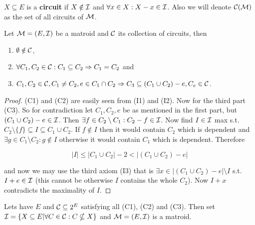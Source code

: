 \begin{defn}
	$X \subseteq E$ is a \textbf{circuit} if $X \notin \mathcal{I}$ and $\forall x \in X : X - x \in \mathcal{I}$. Also we will denote $\mathcal{C}(\mathcal{M})$ as the set of all circuits of $\mathcal{M}$.
\end{defn}

\begin{lemma}
	Let $\mathcal{M} = (E, \mathcal{I})$ be a matroid and $\mathcal{C}$ its collection of circuits, then
	
	\begin{enumerate}[(C1)]
		\item $\emptyset \notin \mathcal{C}$,
		\item $\forall C_1, C_2 \in \mathcal{C} : C_1 \subseteq C_2 \Rightarrow C_1 = C_2$ and
		\item $C_1, C_2 \in \mathcal{C}, C_1 \neq C_2, e \in C_1 \cap C_2 \Rightarrow C_3 \subseteq (C_1 \cup C_2) -e , C_e \in \mathcal{C}$.
	\end{enumerate}
\end{lemma}

\begin{proof}
	(C1) and (C2) are easily seen from (I1) and (I2). Now for the third part (C3). So for contradiction let $C_1, C_2, e$ be as mentioned in the first part, but $(C_1 \cup C_2) - e \in \mathcal{I}$. Then $\exists f \in C_2 \setminus C_1 : C_2 - f \in \mathcal{I}$. Now find $I \in \mathcal{I}$ max s.t. $C_2 \setminus \{f\} \subseteq I \subseteq C_1 \cup C_2$. If $f \notin I$ then it would contain $C_2$ which is dependent and $\exists g \in C_1 \setminus C_2 : g \notin I$ otherwise it would contain $C_1$ which is dependent. Therefore
	
	$$
	|I| \leq | C_1 \cup C_2 | - 2 < |(C_1 \cup C_2) - e|
	$$
	
	\noindent and now we may use the third axiom (I3) that is $\exists x \in |(C_1 \cup C_2) - e| \setminus I$ s.t. $I + e \in \mathcal{I}$ (this cannot be otherwise $I$ contains the whole $C_2$). Now $I + x$ contradicts the maximality of $I$.
\end{proof}

\begin{claim}
	Lets have $E$ and $\mathcal{C} \subseteq 2^E$ satisfying all (C1), (C2) and (C3). Then set $\mathcal{I} = \{X \subseteq E | \forall C \in \mathcal{C} : C \nsubseteq X\}$ and $\mathcal{M} = (E, \mathcal{I})$ is a matroid.
\end{claim}

